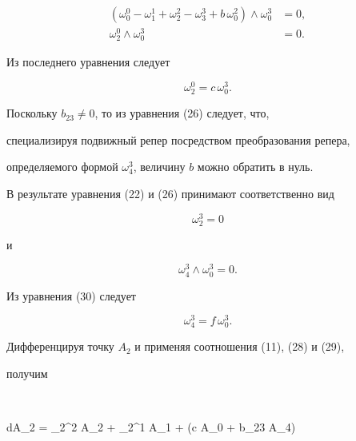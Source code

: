 \begin{align*}


(\omega_0^0 - \omega_1^1 + \omega_2^2 -\omega_3^3 + b \,\omega_0^2)


\wedge \omega_0^3 &= 0, \\


\omega_2^0  \wedge \omega_0^3 &= 0.


\end{align*}


Из последнего уравнения следует


\begin{equation}\label{eq:36}


\omega_2^0 = c \, \omega_0^3.


\end{equation}





Поскольку $b_{23} \neq 0$, то из уравнения (26) следует, что,


специализируя подвижный репер посредством преобразования репера,


определяемого формой $\omega_4^3$, величину $b$ можно обратить в нуль.


В результате уравнения (22) и (26) принимают соответственно вид


\begin{equation}\label{eq:37}


\omega_2^3 = 0


\end{equation}


и


\begin{equation}\label{eq:38}


\omega_4^3 \wedge \omega_0^3 = 0.


\end{equation}


Из уравнения (30) следует


\begin{equation}\label{eq:39}


\omega_4^3 = f \,\omega_0^3.


\end{equation}





Дифференцируя  точку $A_2$ и применяя соотношения  (11), (28) и (29),


получим


$$


dA_2 = \omega_2^2 A_2 + \omega_2^1 A_1 + (c A_0 + b_{23} A_4)


